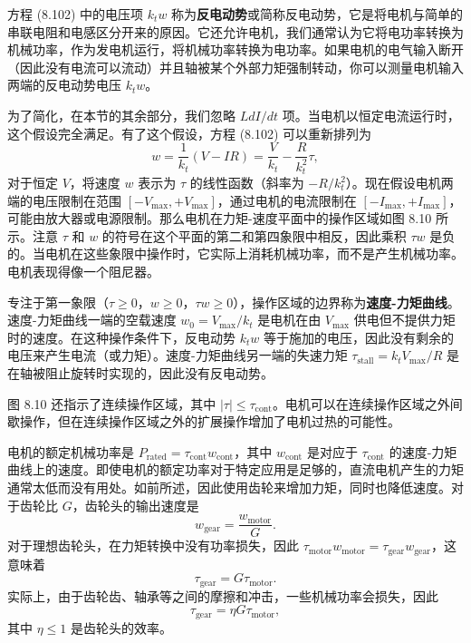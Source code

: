 \documentclass[12pt,a4paper]{article}
\begin{document}
方程 (8.102) 中的电压项 $k_t w$ 称为\textbf{反电动势}或简称反电动势，它是将电机与简单的串联电阻和电感区分开来的原因。它还允许电机，我们通常认为它将电功率转换为机械功率，作为发电机运行，将机械功率转换为电功率。如果电机的电气输入断开（因此没有电流可以流动）并且轴被某个外部力矩强制转动，你可以测量电机输入两端的反电动势电压 $k_t w$。

为了简化，在本节的其余部分，我们忽略 $L dI/dt$ 项。当电机以恒定电流运行时，这个假设完全满足。有了这个假设，方程 (8.102) 可以重新排列为
\begin{equation}
w = \frac{1}{k_t}(V - IR) = \frac{V}{k_t} - \frac{R}{k_t^2}\tau,
\end{equation}
对于恒定 $V$，将速度 $w$ 表示为 $\tau$ 的线性函数（斜率为 $-R/k_t^2$）。现在假设电机两端的电压限制在范围 $[-V_{\max}, +V_{\max}]$，通过电机的电流限制在 $[-I_{\max}, +I_{\max}]$，可能由放大器或电源限制。那么电机在力矩-速度平面中的操作区域如图 8.10 所示。注意 $\tau$ 和 $w$ 的符号在这个平面的第二和第四象限中相反，因此乘积 $\tau w$ 是负的。当电机在这些象限中操作时，它实际上消耗机械功率，而不是产生机械功率。电机表现得像一个阻尼器。

专注于第一象限（$\tau \geq 0$，$w \geq 0$，$\tau w \geq 0$），操作区域的边界称为\textbf{速度-力矩曲线}。速度-力矩曲线一端的空载速度 $w_0 = V_{\max}/k_t$ 是电机在由 $V_{\max}$ 供电但不提供力矩时的速度。在这种操作条件下，反电动势 $k_t w$ 等于施加的电压，因此没有剩余的电压来产生电流（或力矩）。速度-力矩曲线另一端的失速力矩 $\tau_{\text{stall}} = k_t V_{\max}/R$ 是在轴被阻止旋转时实现的，因此没有反电动势。

图 8.10 还指示了连续操作区域，其中 $|\tau| \leq \tau_{\text{cont}}$。电机可以在连续操作区域之外间歇操作，但在连续操作区域之外的扩展操作增加了电机过热的可能性。

电机的额定机械功率是 $P_{\text{rated}} = \tau_{\text{cont}} w_{\text{cont}}$，其中 $w_{\text{cont}}$ 是对应于 $\tau_{\text{cont}}$ 的速度-力矩曲线上的速度。即使电机的额定功率对于特定应用是足够的，直流电机产生的力矩通常太低而没有用处。如前所述，因此使用齿轮来增加力矩，同时也降低速度。对于齿轮比 $G$，齿轮头的输出速度是
\begin{equation}
w_{\text{gear}} = \frac{w_{\text{motor}}}{G}.
\end{equation}
对于理想齿轮头，在力矩转换中没有功率损失，因此 $\tau_{\text{motor}} w_{\text{motor}} = \tau_{\text{gear}} w_{\text{gear}}$，这意味着
\begin{equation}
\tau_{\text{gear}} = G\tau_{\text{motor}}.
\end{equation}
实际上，由于齿轮齿、轴承等之间的摩擦和冲击，一些机械功率会损失，因此
\begin{equation}
\tau_{\text{gear}} = \eta G\tau_{\text{motor}},
\end{equation}
其中 $\eta \leq 1$ 是齿轮头的效率。
\end{document}
